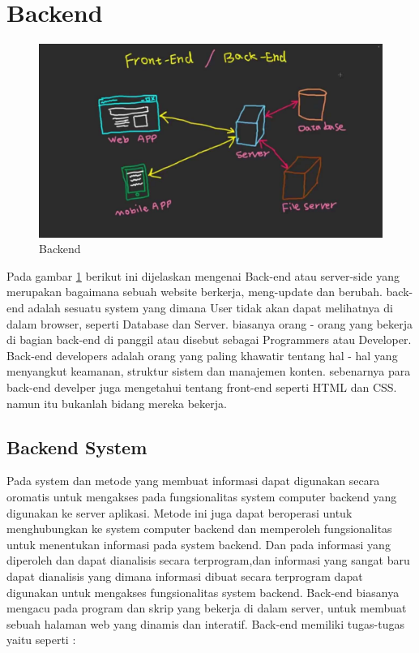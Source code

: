 

\section{Backend}

\begin{figure}[h]
\centerline{\includegraphics[width=1\textwidth]{figures/1backend.jpg}}
\caption{Backend}
\label{1backend}
\end{figure}

	Pada gambar \ref{1backend} berikut ini dijelaskan mengenai Back-end atau server-side yang merupakan bagaimana sebuah website berkerja, meng-update
dan berubah. back-end adalah sesuatu system yang dimana User tidak akan dapat melihatnya di dalam browser,
seperti Database dan Server. biasanya orang - orang yang bekerja di bagian back-end di panggil atau disebut sebagai
Programmers atau Developer. Back-end developers adalah orang yang paling khawatir tentang hal - hal yang menyangkut keamanan,
struktur sistem dan manajemen konten. sebenarnya para back-end develper juga mengetahui tentang front-end seperti HTML dan CSS.
namun itu bukanlah bidang mereka bekerja. 

\subsection{Backend System}
	Pada system dan metode  yang membuat informasi dapat digunakan secara oromatis untuk mengakses 
pada fungsionalitas system computer backend yang digunakan ke server aplikasi. 
Metode ini juga dapat beroperasi untuk menghubungkan ke system computer backend dan memperoleh 
fungsionalitas untuk menentukan informasi  pada system backend. Dan pada informasi yang diperoleh 
dan dapat dianalisis secara terprogram,dan informasi yang sangat baru dapat dianalisis yang dimana 
informasi dibuat secara terprogram dapat digunakan untuk mengakses fungsionalitas system backend.
Back-end biasanya mengacu pada program dan skrip yang bekerja di dalam server, untuk membuat sebuah 
halaman web yang dinamis dan interatif. Back-end memiliki tugas-tugas yaitu seperti :

